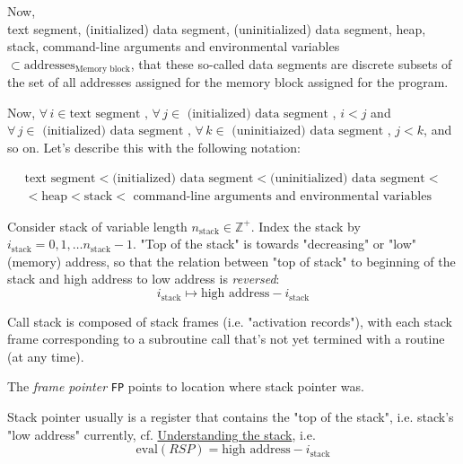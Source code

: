 \documentclass[10pt]{amsart}
\begin{document}
\begin{multicols*}{2}
Now, \\
text segment, (initialized) data segment, (uninitialized) data segment, heap, stack, command-line arguments and environmental variables $\subset \text{addresses}_{\text{Memory block}}$, that these so-called data segments are discrete subsets of the set of all addresses assigned for the memory block assigned for the program.  

Now, $\forall \, i \in \text{text segment }, \, \forall \, j \in \text{ (initialized) data segment }$, $i<j$ and $\forall \, j \in \text{ (initialized) data segment }, \, \forall \, k \in \text{ (uninitiaized) data segment }$, $j<k$, and so on.  Let's describe this with the following notation:  

\begin{equation}
\begin{gathered}
\text{text segment} < \text{(initialized) data segment} < \text{(uninitialized) data segment} < \\ 
< \text{heap} < \text{stack} < \text{ command-line arguments and environmental variables}  
\end{gathered}
\end{equation}


Consider stack of variable length $n_{\text{stack}} \in \mathbb{Z}^+$.  Index the stack by $i_{\text{stack}} = 0,1,\dots n_{\text{stack}} - 1$.  "Top of the stack" is towards "decreasing" or "low" (memory) address, so that the relation between "top of stack" to beginning of the stack and high address to low address is \emph{reversed}: 
\[
i_{\text{stack}} \mapsto \text{high address} - i_{\text{stack}}
\]

Call stack is composed of stack frames (i.e. "activation records"), with each stack frame corresponding to a subroutine call that's not yet termined with a routine (at any time).  

The \emph{frame pointer} \verb|FP| points to location where stack pointer was.  

Stack pointer usually is a register that contains the "top of the stack", i.e. stack's "low address" currently, cf. \href{https://www.cs.umd.edu/class/sum2003/cmsc311/Notes/Mips/stack.html}{Understanding the stack}, i.e. 
\begin{equation}
\text{eval}(RSP) = \text{high address} - i_{\text{stack}}
\end{equation}




\end{multicols*}
\end{document}
